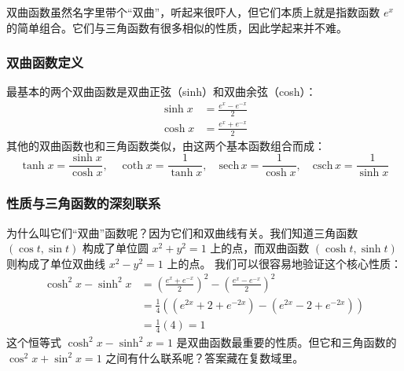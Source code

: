 \documentclass[lang=cn,newtx,10pt,scheme=chinese]{elegantbook}
\begin{document}
\begin{example}
  双曲函数虽然名字里带个“双曲”，听起来很吓人，但它们本质上就是指数函数 $e^x$ 的简单组合。它们与三角函数有很多相似的性质，因此学起来并不难。
  \subsubsection{双曲函数定义}
  最基本的两个双曲函数是双曲正弦（sinh）和双曲余弦（cosh）：
  \begin{align}
    \sinh x &= \frac{e^x - e^{-x}}{2} \\
    \cosh x &= \frac{e^x + e^{-x}}{2}
  \end{align}
  其他的双曲函数也和三角函数类似，由这两个基本函数组合而成：
  \begin{equation}
    \tanh x = \frac{\sinh x}{\cosh x}, \quad \coth x = \frac{1}{\tanh x}, \quad \text{sech}\,x = \frac{1}{\cosh x}, \quad \text{csch}\,x = \frac{1}{\sinh x}
  \end{equation}
  
  \subsubsection{性质与三角函数的深刻联系}
  为什么叫它们“双曲”函数呢？因为它们和双曲线有关。我们知道三角函数 $(\cos t, \sin t)$ 构成了单位圆 $x^2+y^2=1$ 上的点，而双曲函数 $(\cosh t, \sinh t)$ 则构成了单位双曲线 $x^2-y^2=1$ 上的点。
  我们可以很容易地验证这个核心性质：
  \begin{equation}
    \begin{aligned}
      \cosh^2 x - \sinh^2 x &= \left(\frac{e^x + e^{-x}}{2}\right)^2 - \left(\frac{e^x - e^{-x}}{2}\right)^2 \\
      &= \frac{1}{4} \left( (e^{2x} + 2 + e^{-2x}) - (e^{2x} - 2 + e^{-2x}) \right) \\
      &= \frac{1}{4}(4) = 1
    \end{aligned}
  \end{equation}
  这个恒等式 $\cosh^2 x - \sinh^2 x = 1$ 是双曲函数最重要的性质。但它和三角函数的 $\cos^2 x + \sin^2 x = 1$ 之间有什么联系呢？答案藏在复数域里。
  

\end{example}
\end{document}
